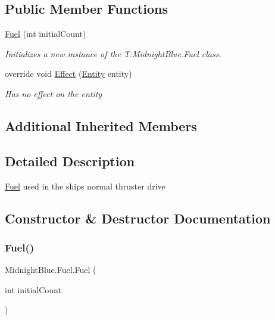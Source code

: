 \subsection*{Public Member Functions}
\begin{DoxyCompactItemize}
\item 
\hyperlink{class_midnight_blue_1_1_fuel_a44747305c7b7d4572d23fd764e568fc1}{Fuel} (int initial\+Count)
\begin{DoxyCompactList}\small\item\em Initializes a new instance of the T\+:\+Midnight\+Blue.\+Fuel class. \end{DoxyCompactList}\item 
override void \hyperlink{class_midnight_blue_1_1_fuel_a9ab52c79211ec8cdcc9389f772615ac0}{Effect} (\hyperlink{class_m_b2_d_1_1_entity_component_1_1_entity}{Entity} entity)
\begin{DoxyCompactList}\small\item\em Has no effect on the entity \end{DoxyCompactList}\end{DoxyCompactItemize}
\subsection*{Additional Inherited Members}


\subsection{Detailed Description}
\hyperlink{class_midnight_blue_1_1_fuel}{Fuel} used in the ships normal thruster drive 



\subsection{Constructor \& Destructor Documentation}
\hypertarget{class_midnight_blue_1_1_fuel_a44747305c7b7d4572d23fd764e568fc1}{}\label{class_midnight_blue_1_1_fuel_a44747305c7b7d4572d23fd764e568fc1} 
\subsubsection{\texorpdfstring{Fuel()}{Fuel()}}
{\footnotesize\ttfamily Midnight\+Blue.\+Fuel.\+Fuel (\begin{DoxyParamCaption}\item[{int}]{initial\+Count }\end{DoxyParamCaption})\hspace{0.3cm}{\ttfamily [inline]}}



